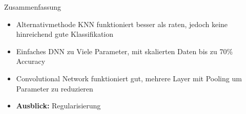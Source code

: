 \documentclass[aspectratio=1610, 9pt]{beamer}
\begin{document}
\begin{frame}{Zusammenfassung}
  \begin{itemize}
  \item Alternativmethode KNN funktioniert besser als raten, jedoch keine hinreichend gute Klassifikation
  \item Einfaches DNN zu Viele Parameter, mit skalierten Daten bis zu 70\% Accuracy
  \item Convolutional Network funktioniert gut, mehrere Layer mit Pooling um Parameter zu reduzieren
  \item \textbf{Ausblick:} Regularisierung
  \end{itemize}
\end{frame}


%
\end{document}
